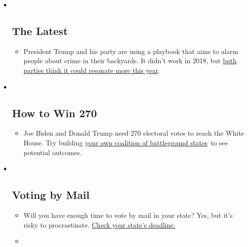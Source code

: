 \begin{itemize}
\item ~
  \hypertarget{the-latest}{%
  \subsection{The Latest}\label{the-latest}}

  \begin{itemize}
  \item
    President Trump and his party are using a playbook that aims to
    alarm people about crime in their backyards. It didn't work in 2018,
    but
    \href{https://www.nytimes3xbfgragh.onion/2020/09/08/us/politics/trump-republicans-fear-strategy.html?action=click\&pgtype=Article\&state=default\&region=BELOW_MAIN_CONTENT\&context=storylines_guide}{both
    parties think it could resonate more this year}.
  \end{itemize}
\item ~
  \hypertarget{how-to-win-270}{%
  \subsection{How to Win 270}\label{how-to-win-270}}

  \begin{itemize}
  \item
    Joe Biden and Donald Trump need 270 electoral votes to reach the
    White House. Try building
    \href{https://www.nytimes3xbfgragh.onion/interactive/2020/us/elections/election-states-biden-trump.html?action=click\&pgtype=Article\&state=default\&region=BELOW_MAIN_CONTENT\&context=storylines_guide}{your
    own coalition of battleground states}~to see potential outcomes.
  \end{itemize}
\item ~
  \hypertarget{voting-by-mail}{%
  \subsection{Voting by Mail}\label{voting-by-mail}}

  \begin{itemize}
  \item
    Will you have enough time to vote by mail in your state? Yes, but
    it's risky to procrastinate.
    \href{https://www.nytimes3xbfgragh.onion/interactive/2020/08/31/us/politics/vote-by-mail-deadlines.html?action=click\&pgtype=Article\&state=default\&region=BELOW_MAIN_CONTENT\&context=storylines_guide}{Check
    your state's deadline.}
  \item
    \href{https://www.nytimes3xbfgragh.onion/interactive/2020/us/elections/joe-biden.html?action=click\&pgtype=Article\&state=default\&region=BELOW_MAIN_CONTENT\&context=storylines_guide}{}


\end{itemize}
\end{itemize}
